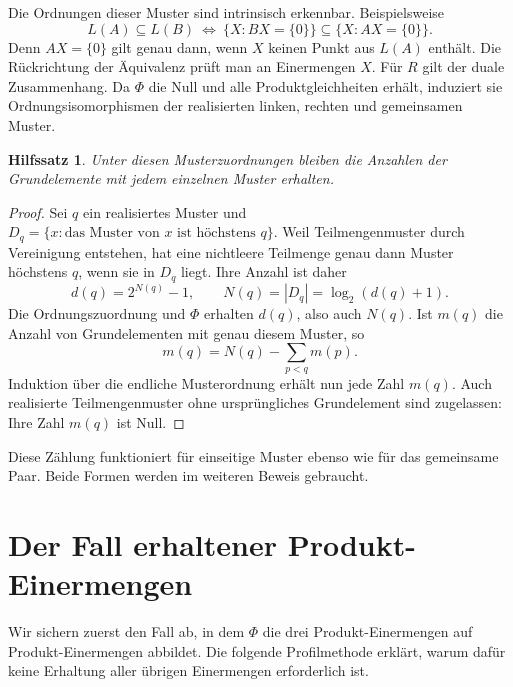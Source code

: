 \documentclass[a4paper,11pt]{article}
\newtheorem{lemma}{Hilfssatz}
\theoremstyle{remark}
\begin{document}
Die Ordnungen dieser Muster sind intrinsisch erkennbar. Beispielsweise
\[
 L(A)\subseteq L(B)
 \ \Longleftrightarrow\ %
 \{X:BX=\{0\}\}\subseteq\{X:AX=\{0\}\}.
\]
Denn \(AX=\{0\}\) gilt genau dann, wenn \(X\) keinen Punkt
aus \(L(A)\) enthält. Die Rückrichtung der Äquivalenz prüft man
an Einermengen \(X\). Für \(R\) gilt der duale Zusammenhang.
Da \(\Phi\) die Null und alle Produktgleichheiten erhält, induziert
sie Ordnungsisomorphismen der realisierten linken, rechten und
gemeinsamen Muster.

\begin{lemma}\label{tp:null-count}
Unter diesen Musterzuordnungen bleiben die Anzahlen der Grundelemente
mit jedem einzelnen Muster erhalten.
\end{lemma}
\begin{proof}
Sei \(q\) ein realisiertes Muster und
\(D_q=\{x:\text{das Muster von }x\text{ ist höchstens }q\}\).
Weil Teilmengenmuster durch Vereinigung entstehen, hat eine nichtleere
Teilmenge genau dann Muster höchstens \(q\), wenn sie in \(D_q\)
liegt. Ihre Anzahl ist daher
\[
 d(q)=2^{N(q)}-1,\qquad N(q)=|D_q|=\log_2(d(q)+1).
\]
Die Ordnungszuordnung und \(\Phi\) erhalten \(d(q)\), also auch
\(N(q)\). Ist \(m(q)\) die Anzahl von Grundelementen mit genau
diesem Muster, so
\[
 m(q)=N(q)-\sum_{p<q}m(p).
\]
Induktion über die endliche Musterordnung erhält nun jede Zahl
\(m(q)\). Auch realisierte Teilmengenmuster ohne ursprüngliches
Grundelement sind zugelassen: Ihre Zahl \(m(q)\) ist Null.
\end{proof}

Diese Zählung funktioniert für einseitige Muster ebenso wie für das
gemeinsame Paar. Beide Formen werden im weiteren Beweis gebraucht.

\section{Der Fall erhaltener Produkt-Einermengen}

Wir sichern zuerst den Fall ab, in dem \(\Phi\) die drei
Produkt-Einermengen auf Produkt-Einermengen abbildet. Die folgende
Profilmethode erklärt, warum dafür keine Erhaltung aller übrigen
Einermengen erforderlich ist.
\end{document}
